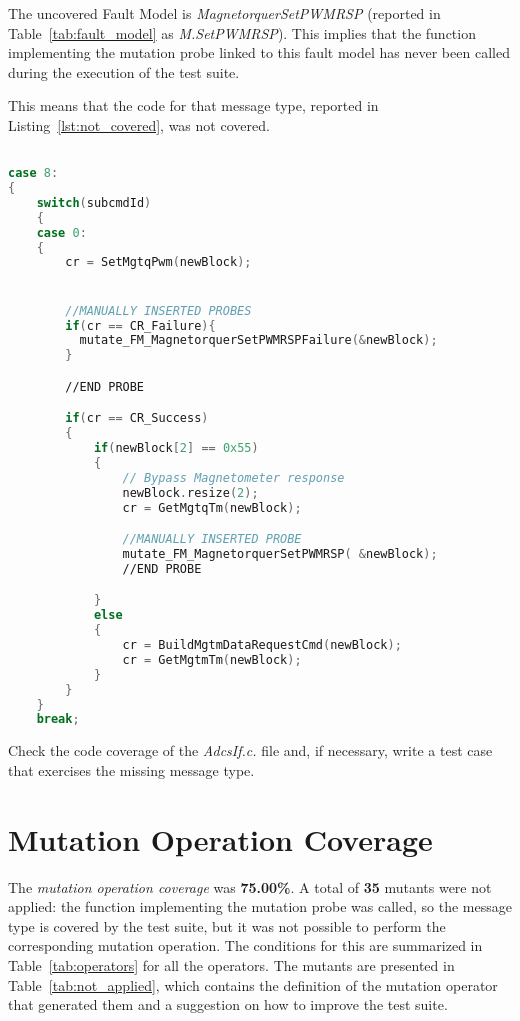 The uncovered Fault Model is \emph{MagnetorquerSetPWMRSP} (reported in Table~\ref{tab:fault_model} as \emph{M.SetPWMRSP}). This implies that the function implementing the mutation probe linked to this fault model has never been called during the execution of the test suite.

This means that the code for that message type, reported in Listing~\ref{lst:not_covered}, was not covered.


\begin{lstlisting}[language=C++, caption=Uncovered portion of source code, label={lst:not_covered}]

case 8:
{
    switch(subcmdId)
    {
    case 0:
    {
        cr = SetMgtqPwm(newBlock);


        //MANUALLY INSERTED PROBES
        if(cr == CR_Failure){
          mutate_FM_MagnetorquerSetPWMRSPFailure(&newBlock);
        }

        //END PROBE

        if(cr == CR_Success)
        {
            if(newBlock[2] == 0x55)
            {
                // Bypass Magnetometer response
                newBlock.resize(2);
                cr = GetMgtqTm(newBlock);

                //MANUALLY INSERTED PROBE
                mutate_FM_MagnetorquerSetPWMRSP( &newBlock);
                //END PROBE

            }
            else
            {
                cr = BuildMgtmDataRequestCmd(newBlock);
                cr = GetMgtmTm(newBlock);
            }
        }
    }
    break;


\end{lstlisting}

\action Check the code coverage of the \emph{AdcsIf.c.} file and, if necessary, write a test case that exercises the missing message type.

\section{Mutation Operation Coverage}

The \emph{mutation operation coverage} was \textbf{75.00\%}. A total of \textbf{35} mutants were not applied: the function implementing the mutation probe was called, so the message type is covered by the test suite, but it was not possible to perform the corresponding mutation operation.
The conditions for this are summarized in Table~\ref{tab:operators} for all the operators.
The mutants are presented in Table~\ref{tab:not_applied}, which contains the definition of the mutation operator that generated them and a suggestion on how to improve the test suite.

